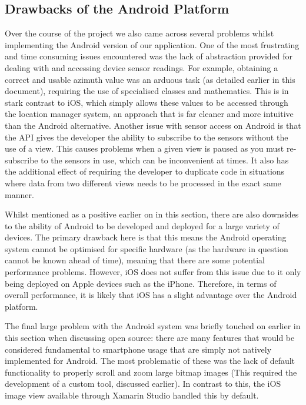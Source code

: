 \documentclass[main.tex]{subfiles}
\begin{document}
        \subsection{Drawbacks of the Android Platform}
            Over the course of the project we also came across several problems whilst implementing the Android version of our application. One of the most frustrating and time
            consuming issues encountered was the lack of abstraction provided for dealing with and accessing device sensor readings. For example, obtaining a correct and usable
            azimuth value was an arduous task (as detailed earlier in this document), requiring the use of specialised classes and mathematics. This is in stark contrast to iOS, which
            simply allows these values to be accessed through the location manager system, an approach that is far cleaner and more intuitive than the Android alternative. Another issue
            with sensor access on Android is that the API gives the developer the ability to subscribe to the sensors without the use of a view. This causes problems when a given view is
            paused as you must re-subscribe to the sensors in use, which can be inconvenient at times. It also has the additional effect of requiring the developer to duplicate code in
            situations where data from two different views needs to be processed in the exact same manner.
            
            Whilst mentioned as a positive earlier on in this section, there are also downsides to the ability of Android to be developed and deployed for a large variety of devices. The 
            primary drawback here is that this means the Android operating system cannot be optimised for specific hardware (as the hardware in question cannot be known ahead 
            of time), meaning that there are some potential performance problems. However, iOS does not suffer from this issue due to it only being deployed on Apple devices such as
            the iPhone. Therefore, in terms of overall performance, it is likely that iOS has a slight advantage over the Android platform.
            
            The final large problem with the Android system was briefly touched on earlier in this section when discussing open source: there are many features that would be considered
            fundamental to smartphone usage that are simply not natively implemented for Android. The most problematic of these was the lack of default functionality to properly
            scroll and zoom large bitmap images (This required the development of a custom tool, discussed earlier). In contrast to this, the iOS image view available through
            Xamarin Studio handled this by default.
\end{document}
